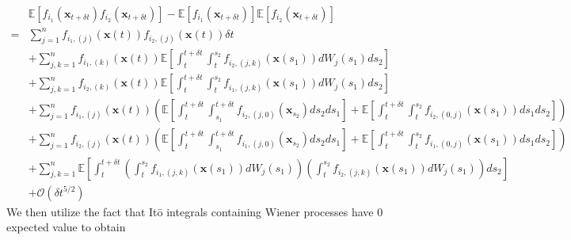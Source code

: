 \begin{equation}
\begin{aligned}
&\mathbb{E} \left[ f_{i_1}(\mathbf{x}_{t + \delta t}) f_{i_2}(\mathbf{x}_{t + \delta t}) \right] 
- \mathbb{E} \left[ f_{i_1}(\mathbf{x}_{t + \delta t}) \right] \mathbb{E} \left[ f_{i_2}(\mathbf{x}_{t + \delta t}) \right] \\
=& 
 \sum_{j=1}^n f_{{i_1},(j)}(\mathbf{x}(t)) f_{{i_2},(j)}(\mathbf{x}(t)) \delta t \\
&+ \sum_{j,k=1}^n f_{{i_1},(k)}(\mathbf{x}(t)) \mathbb{E} \left[  \int_t^{t+\delta t} \int_t^{s_2} f_{{i_2},(j,k)}(\mathbf{x}(s_1)) dW_j(s_1) ds_2 \right] \\
&+  \sum_{j, k=1}^n  f_{{i_2},(k)}(\mathbf{x}(t))\mathbb{E} \left[ \int_t^{t+\delta t} \int_t^{s_2} f_{{i_1},(j,k)}(\mathbf{x}(s_1)) dW_j(s_1) ds_2 \right]\\
&+ \sum_{j=1}^n f_{{i_1},(j)}(\mathbf{x}(t)) \left( \mathbb{E} \left[ \int_t^{t+\delta t} \int_{s_1}^{t+\delta t} f_{{i_2},(j,0)}(\mathbf{x}_{s_2}) ds_2 ds_1 \right] 
+ \mathbb{E} \left[  \int_t^{t+\delta t} \int_t^{s_2} f_{{i_2},(0,j)}(\mathbf{x}(s_1)) ds_1 ds_2\right] \right) \\
&+  \sum_{j=1}^n f_{{i_2},(j)}(\mathbf{x}(t)) \left( \mathbb{E} \left[ \int_t^{t+\delta t} \int_{s_1}^{t + \delta t} f_{{i_1},(j,0)}(\mathbf{x}_{s_2}) ds_2 ds_1 \right]
+ \mathbb{E} \left[ \int_t^{t+\delta t} \int_t^{s_2} f_{{i_1},(0,j)}(\mathbf{x}(s_1)) ds_1 ds_2 \right] \right) \\
&+ \sum_{j, k=1}^n \mathbb{E} \left[ \int_t^{t+\delta t}\left( \int_t^{s_2} f_{{i_1},(j,k)}(\mathbf{x}(s_1)) dW_j(s_1)  \right) \left(  \int_t^{s_2} f_{{i_2},(j,k)}(\mathbf{x}(s_1)) dW_j(s_1) \right) ds_2 \right] \\
&+ \mathcal{O} (\delta t^{5/2})
\end{aligned}
\end{equation}
%
We then utilize the fact that It\={o} integrals containing Wiener processes have 0 expected value to obtain

